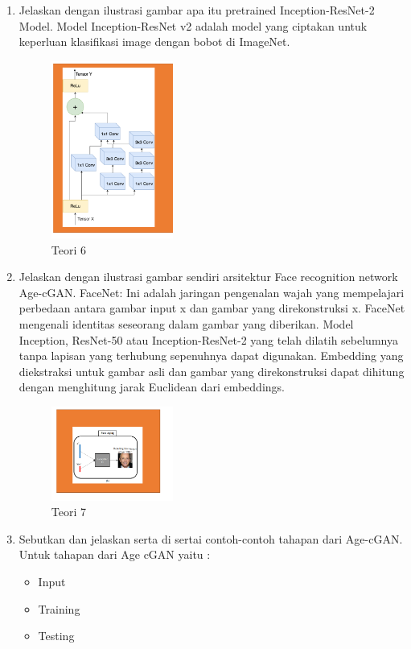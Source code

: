 \begin{enumerate}
	\item Jelaskan dengan ilustrasi gambar apa itu pretrained Inception-ResNet-2 Model.
	\hfill\break
	Model Inception-ResNet v2 adalah model yang ciptakan untuk keperluan klasifikasi image dengan bobot di ImageNet.
	\begin{figure}[H]
		\includegraphics[width=4cm]{figures/1174027/9/teori6.png}
		\centering
		\caption{Teori 6}
	\end{figure}

	\item Jelaskan dengan ilustrasi gambar sendiri arsitektur Face recognition network Age-cGAN.
	\hfill\break
	FaceNet: Ini adalah jaringan pengenalan wajah yang mempelajari perbedaan antara gambar input x dan gambar yang direkonstruksi x. FaceNet mengenali identitas seseorang dalam gambar yang diberikan. Model Inception, ResNet-50 atau Inception-ResNet-2 yang telah dilatih sebelumnya tanpa lapisan yang terhubung sepenuhnya dapat digunakan. Embedding yang diekstraksi untuk gambar asli dan gambar yang direkonstruksi dapat dihitung dengan menghitung jarak Euclidean dari embeddings.
	\begin{figure}[H]
		\includegraphics[width=4cm]{figures/1174027/9/teori7.png}
		\centering
		\caption{Teori 7}
	\end{figure}

	\item Sebutkan dan jelaskan serta di sertai contoh-contoh tahapan dari Age-cGAN.
	\hfill\break
	Untuk tahapan dari Age cGAN yaitu :
	\begin{itemize}
		\item Input
		\item Training
		\item Testing
	\end{itemize}


\end{enumerate}
